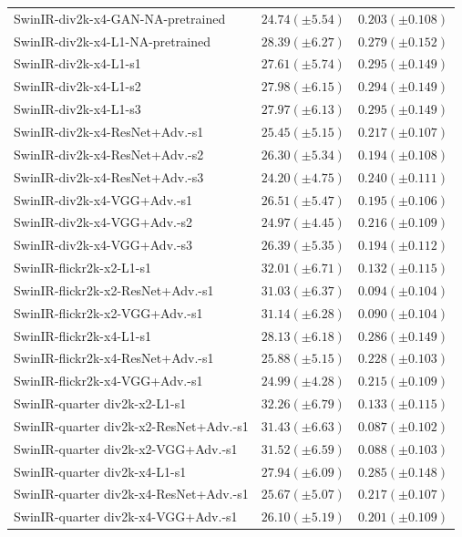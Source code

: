 \documentclass[10pt]{article} %
\begin{document}
\begin{longtable}{| p{} | p{} | p{} |}
SwinIR-div2k-x4-GAN-NA-pretrained & $24.74 (\pm 5.54)$ & $0.203 (\pm 0.108)$ \\
SwinIR-div2k-x4-L1-NA-pretrained & $28.39 (\pm 6.27)$ & $0.279 (\pm 0.152)$ \\
SwinIR-div2k-x4-L1-s1 & $27.61 (\pm 5.74)$ & $0.295 (\pm 0.149)$ \\
SwinIR-div2k-x4-L1-s2 & $27.98 (\pm 6.15)$ & $0.294 (\pm 0.149)$ \\
SwinIR-div2k-x4-L1-s3 & $27.97 (\pm 6.13)$ & $0.295 (\pm 0.149)$ \\
SwinIR-div2k-x4-ResNet+Adv.-s1 & $25.45 (\pm 5.15)$ & $0.217 (\pm 0.107)$ \\
SwinIR-div2k-x4-ResNet+Adv.-s2 & $26.30 (\pm 5.34)$ & $0.194 (\pm 0.108)$ \\
SwinIR-div2k-x4-ResNet+Adv.-s3 & $24.20 (\pm 4.75)$ & $0.240 (\pm 0.111)$ \\
SwinIR-div2k-x4-VGG+Adv.-s1 & $26.51 (\pm 5.47)$ & $0.195 (\pm 0.106)$ \\
SwinIR-div2k-x4-VGG+Adv.-s2 & $24.97 (\pm 4.45)$ & $0.216 (\pm 0.109)$ \\
SwinIR-div2k-x4-VGG+Adv.-s3 & $26.39 (\pm 5.35)$ & $0.194 (\pm 0.112)$ \\
SwinIR-flickr2k-x2-L1-s1 & $32.01 (\pm 6.71)$ & $0.132 (\pm 0.115)$ \\
SwinIR-flickr2k-x2-ResNet+Adv.-s1 & $31.03 (\pm 6.37)$ & $0.094 (\pm 0.104)$ \\
SwinIR-flickr2k-x2-VGG+Adv.-s1 & $31.14 (\pm 6.28)$ & $0.090 (\pm 0.104)$ \\
SwinIR-flickr2k-x4-L1-s1 & $28.13 (\pm 6.18)$ & $0.286 (\pm 0.149)$ \\
SwinIR-flickr2k-x4-ResNet+Adv.-s1 & $25.88 (\pm 5.15)$ & $0.228 (\pm 0.103)$ \\
SwinIR-flickr2k-x4-VGG+Adv.-s1 & $24.99 (\pm 4.28)$ & $0.215 (\pm 0.109)$ \\
SwinIR-quarter div2k-x2-L1-s1 & $32.26 (\pm 6.79)$ & $0.133 (\pm 0.115)$ \\
SwinIR-quarter div2k-x2-ResNet+Adv.-s1 & $31.43 (\pm 6.63)$ & $0.087 (\pm 0.102)$ \\
SwinIR-quarter div2k-x2-VGG+Adv.-s1 & $31.52 (\pm 6.59)$ & $0.088 (\pm 0.103)$ \\
SwinIR-quarter div2k-x4-L1-s1 & $27.94 (\pm 6.09)$ & $0.285 (\pm 0.148)$ \\
SwinIR-quarter div2k-x4-ResNet+Adv.-s1 & $25.67 (\pm 5.07)$ & $0.217 (\pm 0.107)$ \\
SwinIR-quarter div2k-x4-VGG+Adv.-s1 & $26.10 (\pm 5.19)$ & $0.201 (\pm 0.109)$ \\

\end{longtable}
\end{document}
